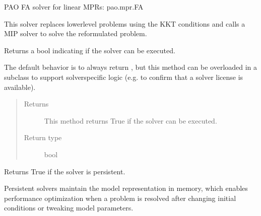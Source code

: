 \documentclass[letterpaper,10pt,english]{sphinxmanual}
\begin{document}
\begin{fulllineitems}
\label{\detokenize{reference/mpr:pao.mpr.solvers.fa.LinearMultilevelSolver_FA}}
PAO FA solver for linear MPRs: pao.mpr.FA

This solver replaces lower\sphinxhyphen{}level problems using the KKT conditions and
calls a MIP solver to solve the reformulated problem.

\begin{fulllineitems}
\label{\detokenize{reference/mpr:pao.mpr.solvers.fa.LinearMultilevelSolver_FA.available}}
Returns a bool indicating if the solver can be executed.

The default behavior is to always return , but this method
can be overloaded in a subclass to support solver\sphinxhyphen{}specific logic
(e.g.  to confirm that a solver license is available).
\begin{quote}\begin{description}
\item[{Returns}] \leavevmode
This method returns True if the solver can be executed.

\item[{Return type}] \leavevmode
bool

\end{description}\end{quote}

\end{fulllineitems}


\begin{fulllineitems}
\label{\detokenize{reference/mpr:pao.mpr.solvers.fa.LinearMultilevelSolver_FA.is_persistent}}
Returns True if the solver is persistent.

Persistent solvers maintain the model representation in memory,
which enables performance optimization when a problem is resolved
after changing initial conditions or tweaking model parameters.


\end{fulllineitems}
\end{fulllineitems}
\end{document}

